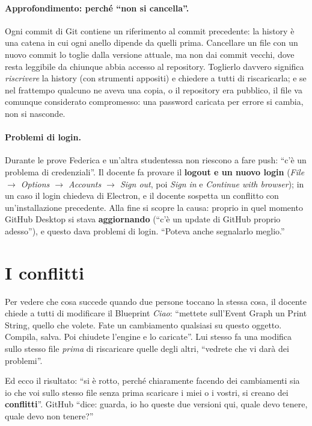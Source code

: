 \paragraph{Approfondimento: perché ``non si cancella''.} Ogni commit di Git
contiene un riferimento al commit precedente: la history è una catena in cui
ogni anello dipende da quelli prima. Cancellare un file con un nuovo commit lo
toglie dalla versione attuale, ma non dai commit vecchi, dove resta leggibile da
chiunque abbia accesso al repository. Toglierlo davvero significa
\emph{riscrivere} la history (con strumenti appositi) e chiedere a tutti di
riscaricarla; e se nel frattempo qualcuno ne aveva una copia, o il repository
era pubblico, il file va comunque considerato compromesso: una password
caricata per errore si cambia, non si nasconde.

\paragraph{Problemi di login.} Durante le prove Federica e un'altra studentessa
non riescono a fare push: ``c'è un problema di credenziali''. Il docente fa
provare il \textbf{logout e un nuovo login} (\emph{File $\rightarrow$ Options
$\rightarrow$ Accounts $\rightarrow$ Sign out}, poi \emph{Sign in} e
\emph{Continue with browser}); in un caso il login chiedeva di Electron, e il
docente sospetta un conflitto con un'installazione precedente. Alla fine si
scopre la causa: proprio in quel momento GitHub Desktop si stava
\textbf{aggiornando} (``c'è un update di GitHub proprio adesso''), e questo
dava problemi di login. ``Poteva anche segnalarlo meglio.''

\section{I conflitti}
\label{gd13:sec:conflitti}

Per vedere che cosa succede quando due persone toccano la stessa cosa, il
docente chiede a tutti di modificare il Blueprint \emph{Ciao}: ``mettete
sull'Event Graph un Print String, quello che volete. Fate un cambiamento
qualsiasi su questo oggetto. Compila, salva. Poi chiudete l'engine e lo
caricate''. Lui stesso fa una modifica sullo stesso file \emph{prima} di
riscaricare quelle degli altri, ``vedrete che vi darà dei problemi''.

Ed ecco il risultato: ``si è rotto, perché chiaramente facendo dei cambiamenti
sia io che voi sullo stesso file senza prima scaricare i miei o i vostri, si
creano dei \textbf{conflitti}''. GitHub ``dice: guarda, io ho queste due
versioni qui, quale devo tenere, quale devo non tenere?''

